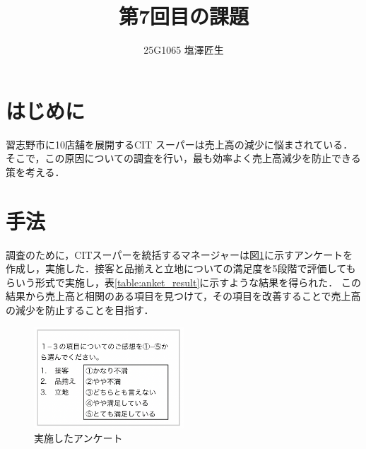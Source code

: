 \documentclass[uplatex]{jsarticle}
\begin{document}
\title{第7回目の課題}
\author{25G1065 塩澤匠生}
\maketitle


\section{はじめに}
習志野市に10店舗を展開するCIT スーパーは売上高の減少に悩まされている．そこで，この原因についての調査を行い，最も効率よく売上高減少を防止できる策を考える．


\section{手法}
調査のために，CITスーパーを統括するマネージャーは図\ref{fig:anket}に示すアンケートを作成し，実施した．接客と品揃えと立地についての満足度を5段階で評価してもらいう形式で実施し，表\ref{table:anket_result}に示すような結果を得られた．
この結果から売上高と相関のある項目を見つけて，その項目を改善することで売上高の減少を防止することを目指す．



\begin{figure}[H]
    \centering
    \includegraphics[width=0.5\textwidth]{anket.png}
    \caption{実施したアンケート}
    \label{fig:anket}
\end{figure}
\end{document}
